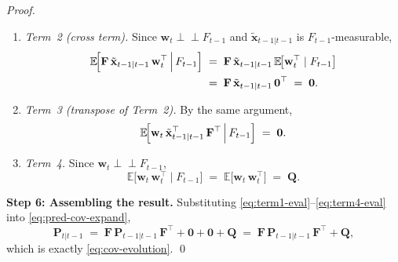 \documentclass[12pt,openany]{book}
\numberwithin{equation}{chapter}
\theoremstyle{plain}
\theoremstyle{definition}
\theoremstyle{remark}
\def\mathcal#1{#1}%
\begin{document}
\begin{proof}
\begin{enumerate}
  \item \emph{Term~2 (cross term).}
        Since $\mathbf{w}_t \perp\!\!\!\perp \mathcal{F}_{t-1}$
        and $\tilde{\mathbf{x}}_{t-1|t-1}$ is
        $\mathcal{F}_{t-1}$-measurable,
        \begin{align}
          \mathbb{E}\!\Bigl[
            \mathbf{F}\,\tilde{\mathbf{x}}_{t-1|t-1}\,
            \mathbf{w}_t^\top
            \,\Big|\, \mathcal{F}_{t-1}
          \Bigr]
          &\;=\;
          \mathbf{F}\,\tilde{\mathbf{x}}_{t-1|t-1}\,
          \mathbb{E}\!\bigl[
            \mathbf{w}_t^\top \mid \mathcal{F}_{t-1}
          \bigr]
          \notag \\
          &\;=\;
          \mathbf{F}\,\tilde{\mathbf{x}}_{t-1|t-1}\,
          \mathbf{0}^\top
          \;=\; \mathbf{0}.
          \label{eq:term2-eval}
        \end{align}

  \item \emph{Term~3 (transpose of Term~2).}
        By the same argument,
        \begin{equation}
          \mathbb{E}\!\Bigl[
            \mathbf{w}_t\,
            \tilde{\mathbf{x}}_{t-1|t-1}^\top\,\mathbf{F}^\top
            \,\Big|\, \mathcal{F}_{t-1}
          \Bigr]
          \;=\; \mathbf{0}.
          \label{eq:term3-eval}
        \end{equation}

  \item \emph{Term~4.}
        Since $\mathbf{w}_t \perp\!\!\!\perp \mathcal{F}_{t-1}$,
        \begin{equation}
          \mathbb{E}\!\bigl[
            \mathbf{w}_t\,\mathbf{w}_t^\top
            \mid \mathcal{F}_{t-1}
          \bigr]
          \;=\;
          \mathbb{E}\!\bigl[
            \mathbf{w}_t\,\mathbf{w}_t^\top
          \bigr]
          \;=\; \mathbf{Q}.
          \label{eq:term4-eval}
        \end{equation}
\end{enumerate}

\medskip
\noindent\textbf{Step 6: Assembling the result.}
Substituting \eqref{eq:term1-eval}--\eqref{eq:term4-eval}
into \eqref{eq:pred-cov-expand},
\begin{equation}
  \mathbf{P}_{t|t-1}
  \;=\;
  \mathbf{F}\,\mathbf{P}_{t-1|t-1}\,\mathbf{F}^\top
  + \mathbf{0}
  + \mathbf{0}
  + \mathbf{Q}
  \;=\;
  \mathbf{F}\,\mathbf{P}_{t-1|t-1}\,\mathbf{F}^\top
  + \mathbf{Q},
  \label{eq:pred-cov-assembled}
\end{equation}
which is exactly \eqref{eq:cov-evolution}.  \qed


\end{proof}
\end{document}
